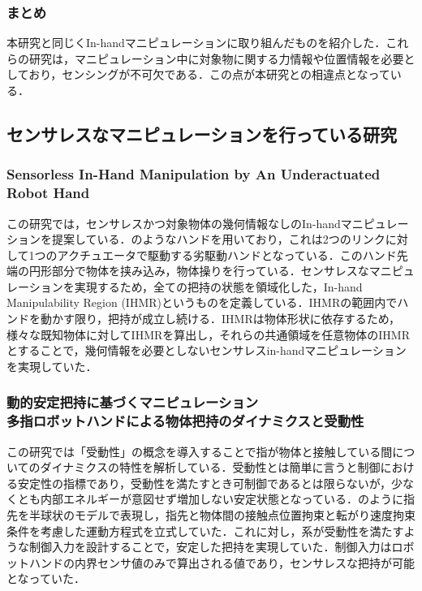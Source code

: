 \documentclass[a4paper,twoside,12pt,papersize, dvipdfmx]{iirthesis}
\begin{document}
\subsubsection{まとめ}
本研究と同じくIn-handマニピュレーションに取り組んだものを紹介した．これらの研究は，マニピュレーション中に対象物に関する力情報や位置情報を必要としており，センシングが不可欠である．この点が本研究との相違点となっている．


\subsection{センサレスなマニピュレーションを行っている研究}
\subsubsection{Sensorless In-Hand Manipulation by An Underactuated Robot Hand \cite{Ospina}}	\label{sec::ospina}
この研究では，センサレスかつ対象物体の幾何情報なしのIn-handマニピュレーションを提案している．のようなハンドを用いており，これは2つのリンクに対して1つのアクチュエータで駆動する劣駆動ハンドとなっている．このハンド先端の円形部分で物体を挟み込み，物体操りを行っている．センサレスなマニピュレーションを実現するため，全ての把持の状態を領域化した，In-hand Manipulability Region (IHMR)というものを定義している．IHMRの範囲内でハンドを動かす限り，把持が成立し続ける．IHMRは物体形状に依存するため，様々な既知物体に対してIHMRを算出し，それらの共通領域を任意物体のIHMRとすることで，幾何情報を必要としないセンサレスin-handマニピュレーションを実現していた．

\subsubsection{動的安定把持に基づくマニピュレーション \cite{Tahara2013}\\多指ロボットハンドによる物体把持のダイナミクスと受動性 \cite{Tahara2020}}
この研究では「受動性」の概念を導入することで指が物体と接触している間についてのダイナミクスの特性を解析している．受動性とは簡単に言うと制御における安定性の指標であり，受動性を満たすとき可制御であるとは限らないが，少なくとも内部エネルギーが意図せず増加しない安定状態となっている．のように指先を半球状のモデルで表現し，指先と物体間の接触点位置拘束と転がり速度拘束条件を考慮した運動方程式を立式していた．これに対し，系が受動性を満たすような制御入力を設計することで，安定した把持を実現していた．制御入力はロボットハンドの内界センサ値のみで算出される値であり，センサレスな把持が可能となっていた．
\end{document}
